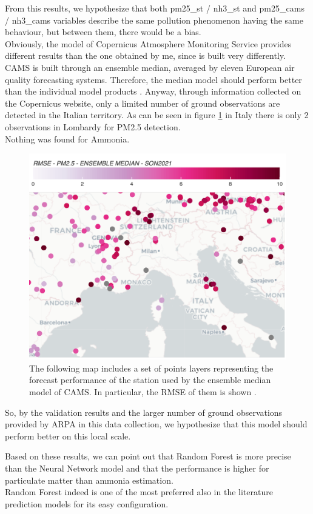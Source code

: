 From this results, we hypothesize that both pm25\_st / nh3\_st and pm25\_cams / nh3\_cams variables describe the same pollution phenomenon having the same behaviour, but between them, there would be a bias.\\
Obviously, the model of Copernicus Atmosphere Monitoring Service provides different results than the one obtained by me, since is built very differently. CAMS is built through an ensemble median, averaged by eleven European air quality forecasting systems. Therefore, the median model should perform better than the individual model products \cite{riccio2007seeking}.
Anyway, through information collected on the Copernicus website, only a limited number of ground observations are detected in the Italian territory. As can be seen in figure \ref{fig:cams} in Italy there is only 2 observations in Lombardy for PM2.5 detection.\\
Nothing was found for Ammonia.
\begin{figure}[H]
    \centering
    \includegraphics[scale=0.2]{images/cams_obs.png}
    \caption{The following map includes a set of points layers representing the forecast performance of the station used by the ensemble median model of CAMS. In particular, the RMSE of them is shown \cite{camsobs}. 
}
    \label{fig:cams}
\end{figure}

So, by the validation results and the larger number of ground observations provided by ARPA in this data collection, we hypothesize that this model should perform better on this local scale.
\par
Based on these results, we can point out that Random Forest is more precise than the  Neural Network model and that the performance is higher for particulate matter than ammonia estimation.\\
Random Forest indeed is one of the most preferred also in the literature prediction models for its easy configuration.
